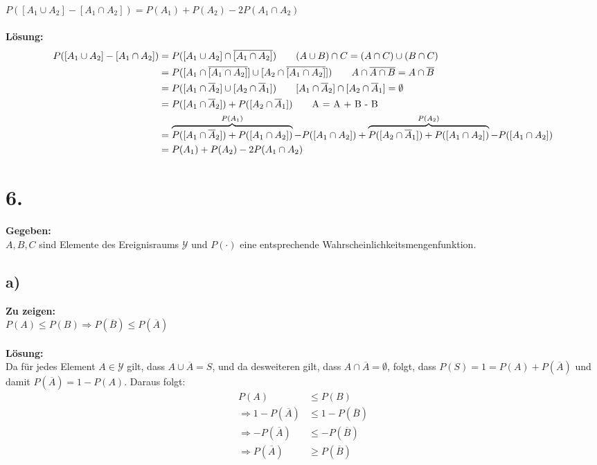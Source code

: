 \documentclass{article}
\begin{document}
$P([A_{1} \cup A_{2}] - [A_{1}\cap A_{2}]) = P(A_{1}) + P(A_{2}) - 2P(A_{1}\cap A_{2})$ \\ \\
\textbf{Lösung:} 
\begin{align*}
    P([A_{1} \cup A_{2}] - [A_{1}\cap A_{2}]) &= P([A_{1} \cup A_{2}] \cap \overline{[A_{1} \cap A_{2}]}) \tag*{$(A\cup B ) \cap C = (A\cap C) \cup (B \cap C)$}\\
    &=P([A_{1}\cap \overline{[A_{1} \cap A_{2}]}] \cup [A_{2}\cap \overline{[A_{1} \cap A_{2}]}] ) \tag*{$A \cap \overline{A\cap B}= A \cap \overline{B}$}\\
    &= P([A_{1}\cap \overline{A}_{2}] \cup [A_{2}\cap \overline{A}_{1}]) \tag*{$[A_{1}\cap \overline{A}_{2}] \cap [A_{2}\cap \overline{A}_{1}] = \emptyset$} \\
    &= P([A_{1}\cap \overline{A}_{2}]) + P([A_{2}\cap \overline{A}_{1}]) \tag*{A = A + B - B}\\
    &= \overbrace{P([A_{1}\cap \overline{A}_{2}]) + P([A_{1}\cap A_{2}])}^{P(A_{1})} - P([A_{1}\cap A_{2}]) + \overbrace{P([A_{2}\cap \overline{A}_{1}]) + P([A_{1}\cap A_{2}])}^{P(A_{2})} - P([A_{1}\cap A_{2}]) \\
    &= P(A_{1}) + P(A_{2}) - 2P(A_{1}\cap A_{2})
\end{align*}

\section*{6.}

\textbf{Gegeben:} \\

$A, B, C$ sind Elemente des Ereignisraums $\mathcal{Y}$ und $P(\cdot)$ eine entsprechende Wahrscheinlichkeitsmengenfunktion.

\subsection*{a)}

\textbf{Zu zeigen: } \\

$P(A) \leq P(B) \Rightarrow P(\overline{B}) \leq P(\overline{A})$   \\ \\
\textbf{Lösung:} \\

Da für jedes Element $A \in \mathcal{Y}$ gilt, dass $A \cup \overline{A} = S$, und da desweiteren gilt, dass $A \cap \overline{A} = \emptyset$, folgt, dass $P(S) = 1 = P(A) + P(\overline{A})$ und damit $P(\overline{A}) = 1 - P(A)$. Daraus folgt:   
\begin{align*}
    P(A) &\leq P(B) \\
    \Rightarrow  1-P(\overline{A}) &\leq 1 - P(\overline{B}) \tag*{$-1$}\\
    \Rightarrow -P(\overline{A}) &\leq - P(\overline{B}) \tag*{$\cdot (-1)$; Dreht das Ungleichunssymbol um} \\
    \Rightarrow P(\overline{A}) &\geq P(\overline{B})  
\end{align*}
\end{document}
